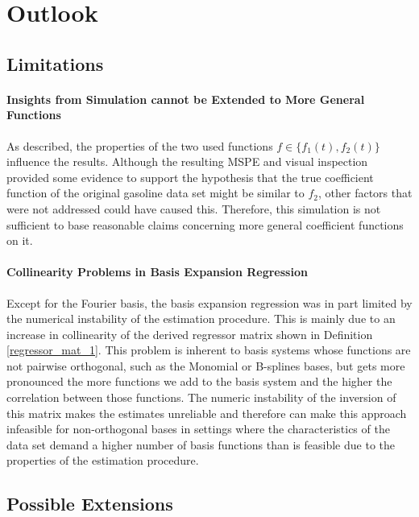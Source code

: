 \documentclass[11pt,twoside,a4paper]{article}
\begin{document}

	\section{Outlook}\label{Outlook}
	
	\subsection*{Limitations}
	
	\paragraph{Insights from Simulation cannot be Extended to More General Functions}
	As described, the properties of the two used functions $f \in \{f_1(t), f_2(t)\}$ influence the results. Although the resulting MSPE and visual inspection provided some evidence to support the hypothesis that the true coefficient function of the original gasoline data set might be similar to $f_2$, other factors that were not addressed could have caused this. Therefore, this simulation is not sufficient to base reasonable claims concerning more general coefficient functions on it.
	\vspace{-0.2cm}
	
	\paragraph{Collinearity Problems in Basis Expansion Regression}
	Except for the Fourier basis, the basis expansion regression was in part limited by the numerical instability of the estimation procedure. This is mainly due to an increase in collinearity of the derived regressor matrix shown in Definition \ref{regressor_mat_1}. This problem is inherent to basis systems whose functions are not pairwise orthogonal, such as the Monomial or B-splines bases, but gets more pronounced the more functions we add to the basis system and the higher the correlation between those functions.
	The numeric instability of the inversion of this matrix makes the estimates unreliable and therefore can make this approach infeasible for non-orthogonal bases in settings where the characteristics of the data set demand a higher number of basis functions than is feasible due to the properties of the estimation procedure.
	\vspace{-0.2cm}
	
	\subsection*{Possible Extensions}
	
\end{document}
